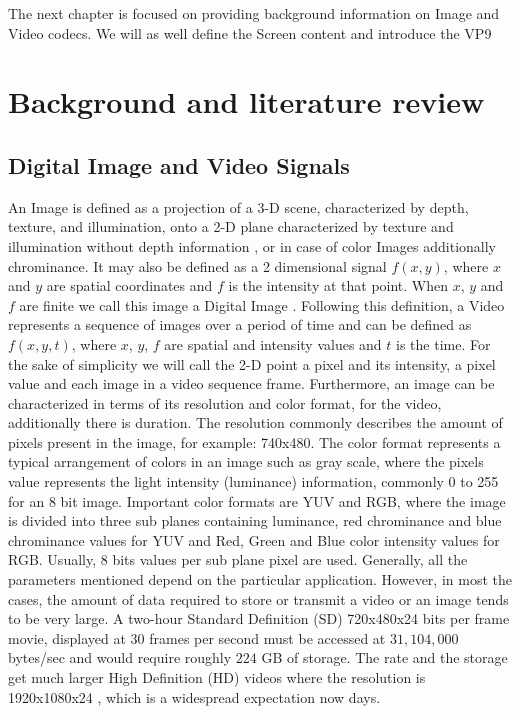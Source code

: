 \documentclass[a4paper,11pt,oneside]{article}
\begin{document}
\indent The next chapter is focused on providing background information on Image and Video codecs. We will as well define the Screen content and introduce the VP9 \\

\newpage
\section{Background and literature review}
\subsection{Digital Image and Video Signals}
\indent An Image is defined as a projection of a 3-D scene, characterized by depth, texture, and illumination, onto a 2-D plane characterized by texture and illumination without depth information \cite[pp.~5]{richardson2002video}, or in case of color Images additionally chrominance. It may also be defined as a 2 dimensional signal $ f(x, y) $, where $x$ and $y$ are spatial coordinates and $f$ is the intensity at that point. When $x$, $y$ and $f$ are finite we call this image a Digital Image \cite[ppp.~1]{gonzalez2008digital}. 
Following this definition, a Video represents a sequence of images over a period of time and can be defined as $f(x,y,t)$, where $x$, $y$, $f$ are spatial and intensity values and $t$ is the time.
For the sake of simplicity we will call the 2-D point a pixel and its intensity, a pixel value and each image in a video sequence frame.
Furthermore, an image can be characterized in terms of its resolution and color format, for the video, additionally there is duration. The resolution commonly describes the amount of pixels present in the image, for example: 740x480. The color format represents a typical arrangement of colors in an image such as gray scale, where the pixels value represents the light intensity (luminance) information, commonly 0 to 255 for an 8 bit image. Important color formats are YUV and RGB, where the image is divided into three sub planes containing luminance, red chrominance and blue chrominance values for YUV and Red, Green and Blue color intensity values for RGB. Usually, 8 bits values per sub plane pixel are used. Generally, all the parameters mentioned depend on the particular application. However, in most the cases, the amount of data required to store or transmit a video or an image tends to be very large. A two-hour Standard Definition (SD) 720x480x24 bits per frame movie, displayed at 30 frames per second must be accessed at $ 31,104,000 $ bytes/sec and would require roughly $224$ GB of storage. The rate and the storage get much larger High Definition (HD) videos where the resolution is 1920x1080x24 \cite[pp.~525-526]{gonzalez2008digital}, which is a widespread expectation now days. \\
\end{document}

